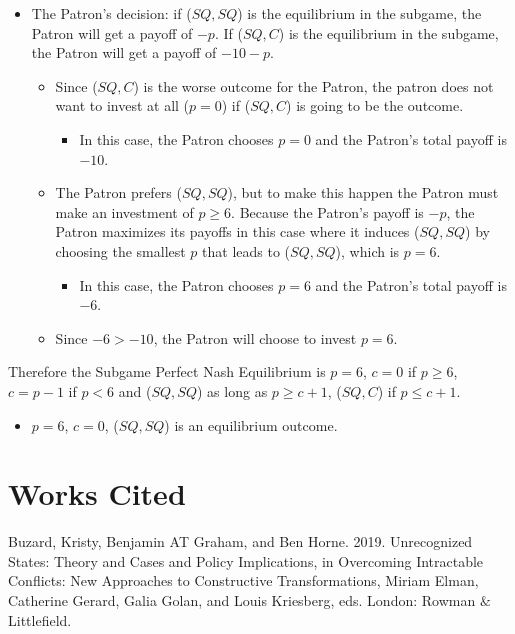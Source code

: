 \documentclass[12pt]{article}
\begin{document}
\begin{itemize}
\begin{itemize}
		\end{itemize}
	\item The Patron's decision: if ($SQ,SQ$) is the equilibrium in the subgame, the Patron will get a payoff of $-p$. If ($SQ,C$) is the equilibrium in the subgame, the Patron will get a payoff of $-10-p$.
		\begin{itemize}
			\item Since ($SQ,C$) is the worse outcome for the Patron, the patron does not want to invest at all ($p=0$) if ($SQ,C$) is going to be the outcome. 
				\begin{itemize}
					\item In this case, the Patron chooses $p=0$ and the Patron's total payoff is $-10$.
				\end{itemize}
			\item The Patron prefers ($SQ,SQ$), but to make this happen the Patron must make an investment of $p \geq 6$. Because the Patron's payoff is $-p$, the Patron maximizes its payoffs in this case where it induces ($SQ,SQ$) by choosing the smallest $p$ that leads to ($SQ,SQ$), which is $p=6$. 
				\begin{itemize}
					\item In this case, the Patron chooses $p=6$ and the Patron's total payoff is $-6$.
				\end{itemize}
			\item Since $-6 > -10$, the Patron will choose to invest $p=6$.
		\end{itemize}
\end{itemize}
Therefore the Subgame Perfect Nash Equilibrium is $p=6$, $c = 0$ if $p \geq 6$, $c = p-1$ if $p < 6$ and ($SQ,SQ$) as long as $p \geq c+1$, ($SQ,C$) if $p \leq c+ 1$.
\begin{itemize}
	\item $p=6$, $c = 0$, ($SQ,SQ$) is an equilibrium outcome.
\end{itemize}

\section{Works Cited}

Buzard, Kristy, Benjamin AT Graham, and Ben Horne. 2019. Unrecognized States: Theory and Cases and Policy Implications, in Overcoming Intractable Conflicts: New Approaches to Constructive Transformations, Miriam Elman, Catherine Gerard, Galia Golan, and Louis Kriesberg, eds. London: Rowman $\&$ Littlefield.\\
\end{document}
